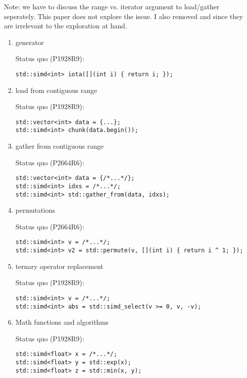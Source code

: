 Note: we have to discuss the range vs. iterator argument to load/gather seperately.
This paper does not explore the issue.
I also removed  and  since they are irrelevant
to the exploration at hand.

\begin{enumerate}
  \item \label{fun:generator} \simd generator

    Status quo (P1928R9):
    \medskip\begin{lstlisting}[style=Vc]
std::simd<int> iota([](int i) { return i; });
    \end{lstlisting}

  \item \label{fun:load} \simd load from contiguous range

    Status quo (P1928R9):
    \medskip\begin{lstlisting}[style=Vc]
std::vector<int> data = {...};
std::simd<int> chunk(data.begin());
    \end{lstlisting}

  \item \label{fun:gather} \simd gather from contiguous range

    Status quo (P2664R6):
    \medskip\begin{lstlisting}[style=Vc]
std::vector<int> data = {/*...*/};
std::simd<int> idxs = /*...*/;
std::simd<int> std::gather_from(data, idxs);
    \end{lstlisting}

  \item \label{fun:permute} \simd permutations

    Status quo (P2664R6):
    \medskip\begin{lstlisting}[style=Vc]
std::simd<int> v = /*...*/;
std::simd<int> v2 = std::permute(v, [](int i) { return i ^ 1; });
    \end{lstlisting}

  \item \label{fun:select} \simd ternary operator replacement

    Status quo (P1928R9):
    \medskip\begin{lstlisting}[style=Vc]
std::simd<int> v = /*...*/;
std::simd<int> abs = std::simd_select(v >= 0, v, -v);
    \end{lstlisting}

  \item \label{fun:math} Math functions and algorithms

    Status quo (P1928R9):
    \medskip\begin{lstlisting}[style=Vc]
std::simd<float> x = /*...*/;
std::simd<float> y = std::exp(x);
std::simd<float> z = std::min(x, y);
    \end{lstlisting}


\end{enumerate}
